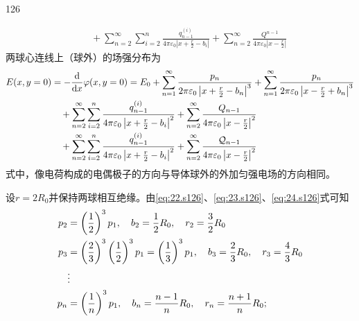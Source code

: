\begin{solution}{126}
\begin{subsolution}
\begin{align}
            &\quad + \sum_ {n = 2} ^ {\infty} \sum_ {i = 2} ^ {n} \frac {q _ {n - 1} ^ {(i)}}{4 \pi \varepsilon_ {0} \left| x + \frac {r}{2} - b _ {i} \right|} + \sum_ {n = 2} ^ {\infty} \frac {Q ^ {n - 1}}{4 \pi \varepsilon_ {0} \left| x - \frac {r}{2} \right|}
            \label{eq:32.s126}
        \end{align}
        两球心连线上（球外）的场强分布为
        \begin{align}
            E (x, y = 0) &= - \frac {\mathrm{d}}{\mathrm{d} x} \varphi (x, y = 0) = E _ {0} + \sum_ {n = 1} ^ {\infty} \frac {p _ {n}}{2 \pi \varepsilon_ {0} \left| x + \frac {r}{2} - b _ {n} \right| ^ {3}} + \sum_ {n = 1} ^ {\infty} \frac {p _ {n}}{2 \pi \varepsilon_ {0} \left| x - \frac {r}{2} + b _ {n} \right| ^ {3}} \notag \\
            &\quad + \sum_ {n = 2} ^ {\infty} \sum_ {i = 2} ^ {n} \frac {q _ {n - 1} ^ {(i)}}{4 \pi \varepsilon_ {0} \left| x + \frac {r}{2} - b _ {i} \right| ^ {2}} + \sum_ {n = 2} ^ {\infty} \frac {Q _ {n - 1}}{4 \pi \varepsilon_ {0} \left| x - \frac {r}{2} \right| ^ {2}} \notag \\
            &\quad + \sum_ {n = 2} ^ {\infty} \sum_ {i = 2} ^ {n} \frac {q _ {n - 1} ^ {(i)}}{4 \pi \varepsilon_ {0} \left| x + \frac {r}{2} - b _ {i} \right| ^ {2}} + \sum_ {n = 2} ^ {\infty} \frac {\mathcal {Q} _ {n - 1}}{4 \pi \varepsilon_ {0} \left| x - \frac {r}{2} \right| ^ {2}}
            \label{eq:33.s126}
        \end{align}
        式中，像电荷构成的电偶极子的方向与导体球外的外加匀强电场的方向相同。
    \end{subsolution}
    \begin{subsolution}
        设$r = 2 R _ { 0 }$并保持两球相互绝缘。由\eqref{eq:22.s126}、\eqref{eq:23.s126}、\eqref{eq:24.s126}式可知
        \begin{align}
            p _ {2} &= \left(\frac {1}{2}\right) ^ {3} p _ {1}, \quad b _ {2} = \frac {1}{2} R _ {0}, \quad r _ {2} = \frac {3}{2} R _ {0} \label{eq:34.s126} \\
            p _ {3} &= \left(\frac {2}{3}\right) ^ {3} \left(\frac {1}{2}\right) ^ {3} p _ {1} = \left(\frac {1}{3}\right) ^ {3} p _ {1}, \quad b _ {3} = \frac {2}{3} R _ {0}, \quad r _ {3} = \frac {4}{3} R _ {0} \label{eq:35.s126} \\
            &\vdots \notag \\
            p _ {n} &= \left(\frac {1}{n}\right) ^ {3} p _ {1}, \quad b _ {n} = \frac {n - 1}{n} R _ {0}, \quad r _ {n} = \frac {n + 1}{n} R _ {0}; \label{eq:36.s126}

\end{align}
\end{subsolution}
\end{solution}
